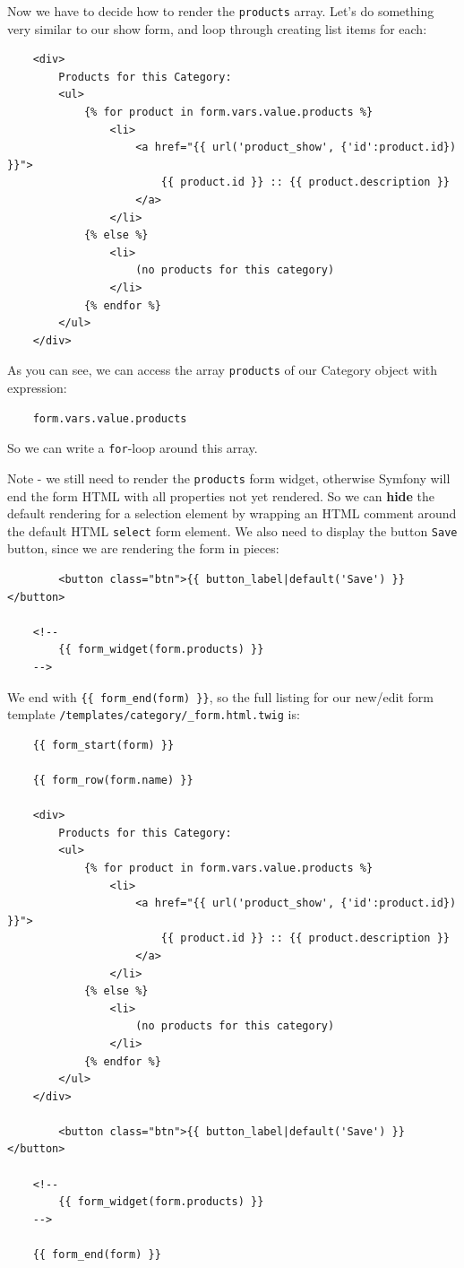 \documentclass[a4paperpaper,openright]{book}
\begin{document}
Now we have to decide how to render the \texttt{products} array. Let's
do something very similar to our show form, and loop through creating
list items for each:

\begin{verbatim}
    <div>
        Products for this Category:
        <ul>
            {% for product in form.vars.value.products %}
                <li>
                    <a href="{{ url('product_show', {'id':product.id}) }}">
                        {{ product.id }} :: {{ product.description }}
                    </a>
                </li>
            {% else %}
                <li>
                    (no products for this category)
                </li>
            {% endfor %}
        </ul>
    </div>
\end{verbatim}

As you can see, we can access the array \texttt{products} of our
Category object with expression:

\begin{verbatim}
    form.vars.value.products
\end{verbatim}

So we can write a \texttt{for}-loop around this array.

Note - we still need to render the \texttt{products} form widget,
otherwise Symfony will end the form HTML with all properties not yet
rendered. So we can \textbf{hide} the default rendering for a selection
element by wrapping an HTML comment around the default HTML
\texttt{select} form element. We also need to display the button
\texttt{Save} button, since we are rendering the form in pieces:

\begin{verbatim}
        <button class="btn">{{ button_label|default('Save') }}</button>
    
    <!--
        {{ form_widget(form.products) }}
    -->
\end{verbatim}

We end with \texttt{\{\{\ form\_end(form)\ \}\}}, so the full listing
for our new/edit form template
\texttt{/templates/category/\_form.html.twig} is:

\begin{verbatim}
    {{ form_start(form) }}
    
    {{ form_row(form.name) }}
    
    <div>
        Products for this Category:
        <ul>
            {% for product in form.vars.value.products %}
                <li>
                    <a href="{{ url('product_show', {'id':product.id}) }}">
                        {{ product.id }} :: {{ product.description }}
                    </a>
                </li>
            {% else %}
                <li>
                    (no products for this category)
                </li>
            {% endfor %}
        </ul>
    </div>
    
        <button class="btn">{{ button_label|default('Save') }}</button>
    
    <!--
        {{ form_widget(form.products) }}
    -->
    
    {{ form_end(form) }}
\end{verbatim}
\end{document}
